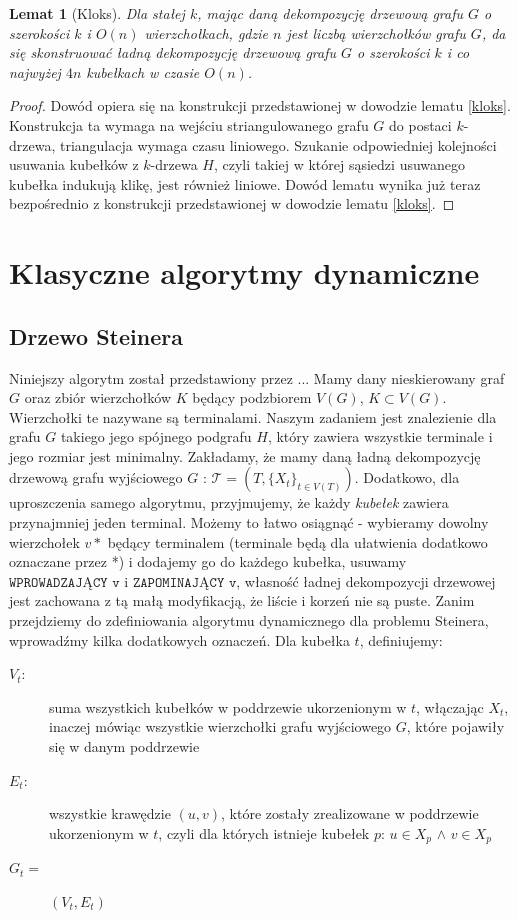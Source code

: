 \documentclass[12pt, oneside]{report}
\newtheorem{lemma}{Lemat}
\newcommand\Omicron{O}
\begin{document}
\begin{lemma}[Kloks]
Dla stałej $k$, mając daną dekompozycję drzewową grafu $G$ o szerokości $k$ i $\Omicron(n)$ wierzchołkach, gdzie $n$ jest liczbą wierzchołków grafu $G$, da się skonstruować ładną dekompozycję drzewową grafu $G$ o szerokości $k$ i co najwyżej $4n$ kubełkach w czasie $\Omicron(n)$. 
\end{lemma}

\begin{proof}
Dowód opiera się na konstrukcji przedstawionej w dowodzie lematu \ref{kloks}. Konstrukcja ta wymaga na wejściu striangulowanego grafu $G$ do postaci $k$-drzewa, triangulacja wymaga czasu liniowego. Szukanie odpowiedniej kolejności usuwania kubełków z $k$-drzewa $H$, czyli takiej w której sąsiedzi usuwanego kubełka indukują klikę, jest również liniowe. Dowód lematu wynika już teraz bezpośrednio z konstrukcji przedstawionej w dowodzie lematu \ref{kloks}.
\end{proof}

\newpage
  	\chapter{Klasyczne algorytmy dynamiczne}
    	\section{Drzewo Steinera}

Niniejszy algorytm został przedstawiony przez ... Mamy dany nieskierowany graf $G$ oraz zbiór wierzchołków $K$ będący podzbiorem $V(G)$, $K \subset V(G)$. Wierzchołki te nazywane są terminalami.
Naszym zadaniem jest znalezienie dla grafu $G$ takiego jego spójnego podgrafu $H$, który zawiera wszystkie terminale i jego rozmiar jest minimalny.
Zakładamy, że mamy daną ładną dekompozycję drzewową grafu wyjściowego $G$ : $\mathcal{T} = (T, \{X_t\}_{t \in V(T)})$. Dodatkowo, dla uproszczenia samego algorytmu, przyjmujemy, że każdy \emph{kubełek} zawiera przynajmniej jeden terminal. Możemy to łatwo osiągnąć - wybieramy dowolny wierzchołek ${v*}$ będący terminalem (terminale będą dla ułatwienia dodatkowo oznaczane przez *) i dodajemy go do każdego kubełka, usuwamy $\texttt{WPROWADZAJĄCY v}$ i $\texttt{ZAPOMINAJĄCY v}$, własność ładnej dekompozycji drzewowej jest zachowana z tą małą modyfikacją, że liście i korzeń nie są puste.
\newline
Zanim przejdziemy do zdefiniowania algorytmu dynamicznego dla problemu Steinera, wprowadźmy kilka dodatkowych oznaczeń.
Dla kubełka $t$, definiujemy:
\begin{description}
\item[$V_t:$]{suma wszystkich kubełków w poddrzewie ukorzenionym w $t$, włączając $X_t$, inaczej mówiąc wszystkie wierzchołki grafu wyjściowego $G$, które pojawiły się w danym poddrzewie}
\item[$E_t:$]{wszystkie krawędzie $(u, v)$, które zostały zrealizowane w poddrzewie ukorzenionym w $t$, czyli dla których istnieje kubełek $p$: $u \in X_p$ $\wedge$ $v \in X_p$} 
\item[$G_t = $]{$(V_t, E_t)$}
\end{description}
\end{document}

